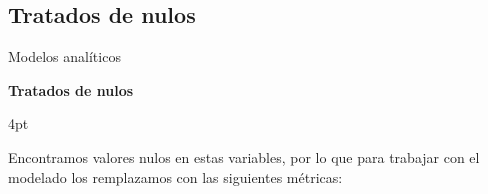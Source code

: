 \documentclass[pdf]{beamer}
\def\\{}%
\def\vspace{}%
\begin{document}
{%

    \subsection{Tratados de nulos}

\begin{frame}{Modelos analíticos}

    \begin{Large}
        \textbf{Tratados de nulos}
    \end{Large}
    \vspace{4pt}

    Encontramos valores nulos en estas variables, por lo que para trabajar con el modelado los remplazamos con las siguientes métricas:


\end{frame}}
\end{document}
